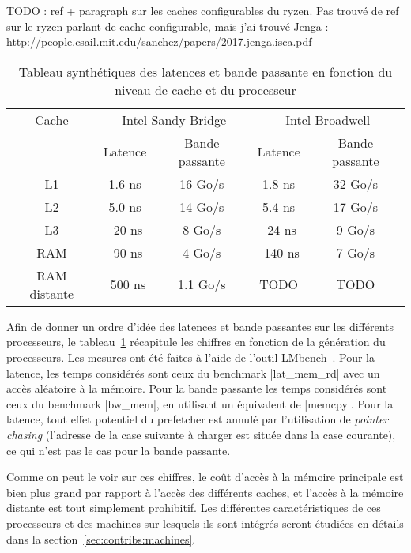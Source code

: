 \begin{todo}
TODO : ref + paragraph sur les caches configurables du ryzen.
Pas trouvé de ref sur le ryzen parlant de cache configurable, mais j'ai trouvé Jenga : http://people.csail.mit.edu/sanchez/papers/2017.jenga.isca.pdf
\end{todo}

\begin{table}[ht]
\def\arraystretch{1.5}
\centering
\begin{tabular}{|c||c|c|c|c|}\hline
  Cache & \multicolumn{2}{c|}{Intel Sandy Bridge} & \multicolumn{2}{c|}{Intel Broadwell}  \\ \cline{2-5} 
 & Latence & Bande passante & Latence & Bande passante \\ \hline
 L1 & 1.6 ns & 16 Go/s & 1.8 ns & 32 Go/s \\ \hline
 L2 & 5.0 ns & 14 Go/s & 5.4 ns & 17 Go/s \\ \hline
 L3 & ~20 ns & 8 Go/s & ~24 ns & 9 Go/s \\ \hline
 RAM & ~90 ns & 4 Go/s & ~140 ns & 7 Go/s \\ \hline
 RAM distante & ~500 ns & 1.1 Go/s & TODO & TODO \\ \hline
\end{tabular}
\caption{Tableau synthétiques des latences et bande passante en fonction du niveau de cache et du processeur}\label{tab:synthese-processeurs}
\end{table}

Afin de donner un ordre d'idée des latences et bande passantes sur les différents processeurs, le tableau~\ref{tab:synthese-processeurs} récapitule les chiffres en fonction de la génération du processeurs.
Les mesures ont été faites à l'aide de l'outil LMbench~\cite{McVoy1996}. Pour la latence, les temps considérés sont ceux du benchmark |lat_mem_rd| avec un accès aléatoire à la mémoire.
Pour la bande passante les temps considérés sont ceux du benchmark |bw_mem|, en utilisant un équivalent de |memcpy|.
Pour la latence, tout effet potentiel du prefetcher est annulé par l'utilisation de \emph{pointer chasing} (l'adresse de la case suivante à charger est située dans la case courante), ce qui n'est pas le cas pour la bande passante.

Comme on peut le voir sur ces chiffres, le coût d'accès à la mémoire principale est bien plus grand par rapport à l'accès des différents caches, et l'accès à la mémoire distante est tout simplement prohibitif.
Les différentes caractéristiques de ces processeurs et des machines sur lesquels ils sont intégrés seront étudiées en détails dans la section~\ref{sec:contribs:machines}.


